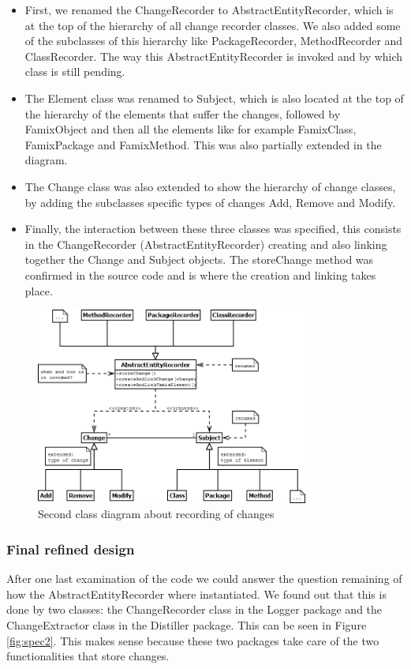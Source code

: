 \documentclass[a4paper]{article}
\begin{document}
\begin{itemize}
\item First, we renamed the ChangeRecorder to AbstractEntityRecorder, which is at the top of the hierarchy of all change recorder classes. We also added some of the subclasses of this hierarchy like PackageRecorder, MethodRecorder and ClassRecorder. The way this AbstractEntityRecorder is invoked and by which class is still pending.

\item The Element class was renamed to Subject, which is also located at the top of the hierarchy of the elements that suffer the changes, followed by FamixObject and then all the elements like for example FamixClass, FamixPackage and FamixMethod. This was also partially extended in the diagram.

\item The Change class was also extended to show the hierarchy of change classes, by adding the subclasses specific types of changes Add, Remove and Modify.

\item Finally, the interaction between these three classes was specified, this consists in the ChangeRecorder (AbstractEntityRecorder) creating and also linking together the Change and Subject objects. The storeChange method was confirmed in the source code and is where the creation and linking takes place.
\end{itemize}

\begin{figure}[h]
\centering
\includegraphics[width=0.8\textwidth]{Images/spec1}
\caption{Second class diagram about recording of changes}
\label{fig:spec1}
\end{figure}

\subsubsection{Final refined design}
\label{sec:finalDesign}
After one last examination of the code we could answer the question remaining of how the AbstractEntityRecorder where instantiated. We found out that this is done by two classes: the ChangeRecorder class in the Logger package and the ChangeExtractor class in the Distiller package. This can be seen in Figure \ref{fig:spec2}. This makes sense because these two packages take care of the two functionalities that store changes.
\end{document}
